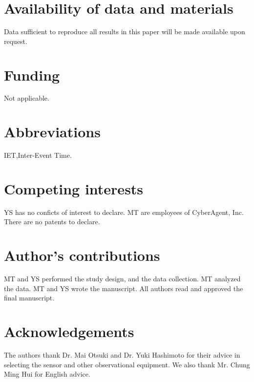 \documentclass{bmcart}
\begin{document}
\begin{backmatter}

\section*{Availability of data and materials}
Data sufficient to reproduce all results in this paper will be made available upon request.

\section*{Funding}
Not applicable.

\section*{Abbreviations}
IET,Inter-Event Time.

\section*{Competing interests}
YS has no conficts of interest to declare. MT are employees of CyberAgent, Inc. There are no patents to declare.

\section*{Author's contributions}
MT and YS performed the study design, and the data collection. 
MT analyzed the data. MT and YS wrote the manuscript.
All authors read and approved the final manuscript.

\section*{Acknowledgements}
The authors thank Dr. Mai Otsuki and Dr. Yuki Hashimoto for their advice in selecting the sensor and other observational equipment. We also thank Mr. Chung Ming Hui for English advice.





\end{backmatter}
\end{document}
